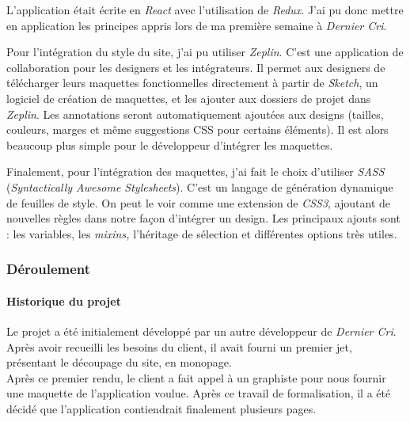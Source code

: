 \bigskip

L'application était écrite en \emph{React} avec l'utilisation de
\emph{Redux}. J'ai pu donc mettre en application les principes appris
lors de ma première semaine à \emph{Dernier Cri}.

\bigskip

Pour l'intégration du style du site, j'ai pu utiliser \emph{Zeplin}.
C'est une application de collaboration pour les designers et les
intégrateurs. Il permet aux designers de télécharger leurs maquettes
fonctionnelles directement à partir de \emph{Sketch}, un logiciel de
création de maquettes, et les ajouter aux dossiers de projet dans
\emph{Zeplin}. Les annotations seront automatiquement ajoutées aux
designs (tailles, couleurs, marges et même suggestions CSS pour certains
éléments). Il est alors beaucoup plus simple pour le développeur
d'intégrer les maquettes.

\bigskip

Finalement, pour l'intégration des maquettes, j'ai fait le choix
d'utiliser \emph{SASS} (\emph{Syntactically Awesome Stylesheets}). C'est
un langage de génération dynamique de feuilles de style. On peut le voir
comme une extension de \emph{CSS3}, ajoutant de nouvelles règles dans
notre façon d'intégrer un design. Les principaux ajouts sont : les
variables, les \emph{mixins,} l'héritage de sélection et différentes
options très utiles.

\bigskip

\subsubsection{Déroulement}\label{duxe9roulement}

\bigskip

\paragraph{Historique du projet}\label{historique-du-projet}

\bigskip

Le projet a été initialement développé par un autre développeur de
\emph{Dernier Cri}. Après avoir recueilli les besoins du client, il
avait fourni un premier jet, présentant le découpage du site, en
monopage.\\
Après ce premier rendu, le client a fait appel à un graphiste pour nous
fournir une maquette de l'application voulue. Après ce travail de
formalisation, il a été décidé que l'application contiendrait finalement
plusieurs pages.

